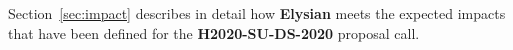 \documentclass[a4paper,11pt]{article}
\newcommand{\project}[1]{\textbf{#1}\xspace}
\newcommand{\SECURITY}{\project{Elysian}}
\newcommand{\TheProject}{\SECURITY}
\begin{document}
Section~\ref{sec:impact} describes in detail how \TheProject{} meets the expected impacts that have been defined for the \textbf{H2020-SU-DS-2020} proposal call.

\end{document}

